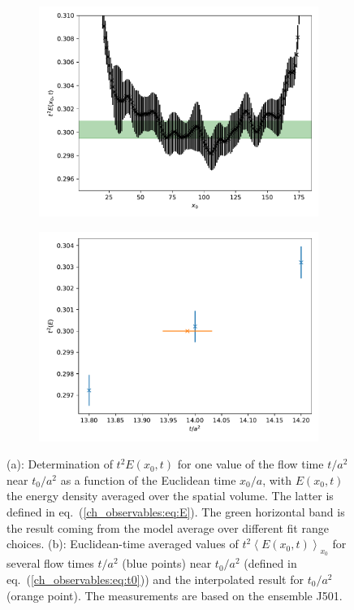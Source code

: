 \begin{figure}
        \label{ch_observables:fig:meff}
\end{figure}

\begin{figure}
    \begin{subfigure}{.49\textwidth}
    	\includegraphics[width=\textwidth]{./cap3/figs/t2E_J501_plat.pdf}
    	\caption{}
    \end{subfigure}
    \begin{subfigure}{.49\textwidth}
    	\includegraphics[width=\textwidth]{./cap3/figs/t0_J501.pdf}
    	\caption{}
    \end{subfigure}
    \caption{(a): Determination of $t^2E(x_0,t)$ for one value of the flow time $t/a^2$ near $t_0/a^2$ as a function of the Euclidean time $x_0/a$, with $E(x_0,t)$ the  energy density averaged over the spatial volume. The latter is defined in eq.~(\ref{ch_observables:eq:E}). The green horizontal band is the result coming from the model average over different fit range choices. (b): Euclidean-time averaged values of $t^2\left<E(x_0,t)\right>_{x_0}$ for several flow times $t/a^2$ (blue points) near $t_0/a^2$ (defined in eq.~(\ref{ch_observables:eq:t0})) and the interpolated result for $t_0/a^2$ (orange point). The measurements are based on the ensemble J501.}
        \label{ch_observables:fig:t2E}
\end{figure}

